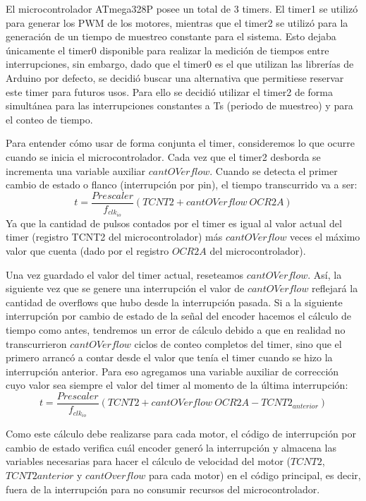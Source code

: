 \documentclass[10pt,conference,a4paper,onecolumn]{article}%
\begin{document}
El microcontrolador ATmega328P posee un total de 3 timers. El timer1 se utilizó para generar los PWM de los motores, mientras que el timer2 se utilizó para la generación de un tiempo de muestreo constante para el sistema. Esto dejaba únicamente el timer0 disponible para realizar la medición de tiempos entre interrupciones,
sin embargo, dado que el timer0 es el que utilizan las librerías de Arduino por defecto, se decidió buscar una alternativa que permitiese reservar este timer para futuros usos. Para ello se decidió utilizar el timer2 de forma simultánea para las interrupciones constantes a Ts (periodo de muestreo) y para el conteo de tiempo.

Para entender cómo usar de forma conjunta el timer, consideremos lo que ocurre cuando se inicia el microcontrolador. Cada vez que el timer2 desborda se incrementa una variable auxiliar $cantOVerflow$. Cuando se detecta el primer cambio de estado o flanco (interrupción por pin), el tiempo transcurrido va a ser:
 \begin{equation*}
 t=\frac{Prescaler}{f_{clk_{io}}} (TCNT2+cantOVerflow\ OCR2A)
 \end{equation*}
Ya que la cantidad de pulsos contados por el timer es igual al valor actual del timer (registro TCNT2 del microcontrolador) más $cantOVerflow$ veces el máximo valor que cuenta (dado por el registro $OCR2A$ del microcontrolador).

Una vez guardado el valor del timer actual, reseteamos $cantOVerflow$. Así, la siguiente vez que se genere una interrupción el valor de $cantOVerflow$ reflejará la cantidad de overflows que hubo desde la interrupción pasada. Si a la siguiente interrupción por cambio de estado de la señal del encoder hacemos el cálculo de tiempo como
antes, tendremos un error de cálculo debido a que en realidad no transcurrieron $cantOVerflow$ ciclos de conteo completos del timer, sino que el primero arrancó a contar desde el valor que tenía el timer cuando se hizo la interrupción anterior. Para eso agregamos una variable auxiliar de corrección cuyo valor sea siempre el valor del
timer al momento de la última interrupción:
 \begin{equation}
 t=\frac{Prescaler}{f_{clk_{io}}} (TCNT2+cantOVerflow\ OCR2A-TCNT2_{anterior})
 \end{equation}

Como este cálculo debe realizarse para cada motor, el código de interrupción por cambio de estado verifica cuál encoder generó la interrupción y almacena las variables necesarias para hacer el cálculo de velocidad del motor ($TCNT2$, $TCNT2anterior$ y $cantOverflow$ para cada motor) en el código principal, es decir, fuera de la interrupción para no consumir recursos del microcontrolador.
\end{document}
